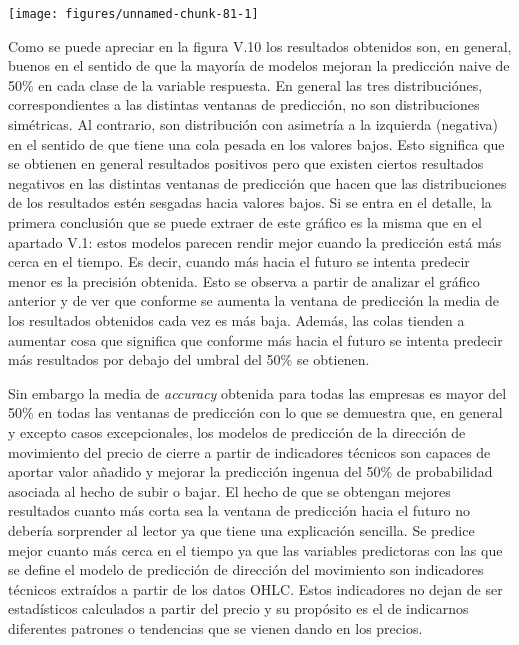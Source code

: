 \documentclass[]{DissertateUSU}
\begin{document}
\begin{center}\texttt{[image: figures/unnamed-chunk-81-1]} \end{center}
\centering

\setlength\parskip{5ex}
\justifying

\noindent Como se puede apreciar en la figura V.10 los resultados
obtenidos son, en general, buenos en el sentido de que la mayoría de
modelos mejoran la predicción naive de 50\% en cada clase de la variable
respuesta. En general las tres distribuciónes, correspondientes a las
distintas ventanas de predicción, no son distribuciones simétricas. Al
contrario, son distribución con asimetría a la izquierda (negativa) en
el sentido de que tiene una cola pesada en los valores bajos. Esto
significa que se obtienen en general resultados positivos pero que
existen ciertos resultados negativos en las distintas ventanas de
predicción que hacen que las distribuciones de los resultados estén
sesgadas hacia valores bajos. Si se entra en el detalle, la primera
conclusión que se puede extraer de este gráfico es la misma que en el
apartado V.1: estos modelos parecen rendir mejor cuando la predicción
está más cerca en el tiempo. Es decir, cuando más hacia el futuro se
intenta predecir menor es la precisión obtenida. Esto se observa a
partir de analizar el gráfico anterior y de ver que conforme se aumenta
la ventana de predicción la media de los resultados obtenidos cada vez
es más baja. Además, las colas tienden a aumentar cosa que significa que
conforme más hacia el futuro se intenta predecir más resultados por
debajo del umbral del 50\% se obtienen.

\noindent Sin embargo la media de \emph{accuracy} obtenida para todas
las empresas es mayor del 50\% en todas las ventanas de predicción con
lo que se demuestra que, en general y excepto casos excepcionales, los
modelos de predicción de la dirección de movimiento del precio de cierre
a partir de indicadores técnicos son capaces de aportar valor añadido y
mejorar la predicción ingenua del 50\% de probabilidad asociada al hecho
de subir o bajar. El hecho de que se obtengan mejores resultados cuanto
más corta sea la ventana de predicción hacia el futuro no debería
sorprender al lector ya que tiene una explicación sencilla. Se predice
mejor cuanto más cerca en el tiempo ya que las variables predictoras con
las que se define el modelo de predicción de dirección del movimiento
son indicadores técnicos extraídos a partir de los datos OHLC. Estos
indicadores no dejan de ser estadísticos calculados a partir del precio
y su propósito es el de indicarnos diferentes patrones o tendencias que
se vienen dando en los precios.
\end{document}
